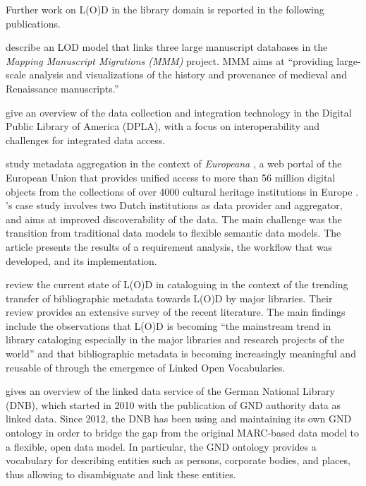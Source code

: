 Further work on L(O)D in the library domain is reported in the following publications.

\textcite{Burrows2021} describe an LOD model that links
three large manuscript databases
in the \emph{Mapping Manuscript Migrations (MMM)} project.
MMM aims at \enquote{providing large-scale analysis and visualizations of the history and provenance of medieval and Renaissance manuscripts.}

\textcite{LigiaTriques2022} give an overview of the data collection and integration technology
in the Digital Public Library of America (DPLA), with a focus on
interoperability and challenges for integrated data access.

\textcite{Freire2019} study metadata aggregation in the context of \emph{Europeana} \autocite{Isaac2012,Petras2017},
a web portal of the European Union that provides unified access to 
more than 56 million digital objects
from the collections of over 4000 cultural heritage institutions in Europe \autocite{Europeana}.
\citeauthor{Freire2019}'s case study involves two Dutch institutions as data provider and aggregator,
and aims at improved discoverability of the data.
The main challenge was the transition from traditional data models to flexible semantic data models.
The article presents the results of a requirement analysis,
the workflow that was developed, and its implementation.

\textcite{Ullah2018} review the current state of L(O)D in cataloguing
in the context of the trending transfer of bibliographic metadata
towards L(O)D by major libraries.
Their review provides an extensive survey of the recent literature.
The main findings include
the observations that L(O)D is becoming
\enquote{the mainstream trend in library cataloging especially in the major libraries and research projects of the world}
and that bibliographic metadata is becoming increasingly meaningful and reusable of through the emergence of Linked Open Vocabularies.

\textcite{Hauser2014} gives an overview of the linked data service
of the German National Library (DNB),
which started in 2010 with the publication of GND authority data as linked data.
Since 2012, the DNB has been using and maintaining its own GND ontology \autocite{GNDOntology}
in order to bridge the gap from the original MARC-based data model to a flexible, open data model.
In particular, the GND ontology provides a vocabulary for describing entities such as persons, corporate bodies, and places,
thus allowing to disambiguate and link these entities.

